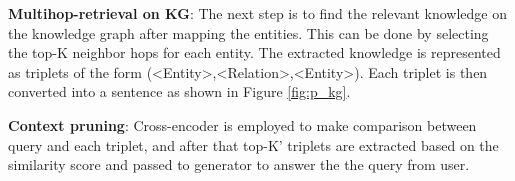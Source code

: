 \textbf{Multihop-retrieval on KG}: The next step is to find the relevant knowledge on the knowledge graph after mapping the entities. This can be done by selecting the top-K neighbor hops for each entity. The extracted knowledge is represented as triplets of the form (<Entity>,<Relation>,<Entity>). Each triplet is then converted into a sentence as shown in Figure \ref{fig:p_kg}.

\textbf{Context pruning}: Cross-encoder is employed to make comparison between query and each triplet, and after that top-K' triplets are extracted based on the similarity score and passed to generator to answer the the query from user.